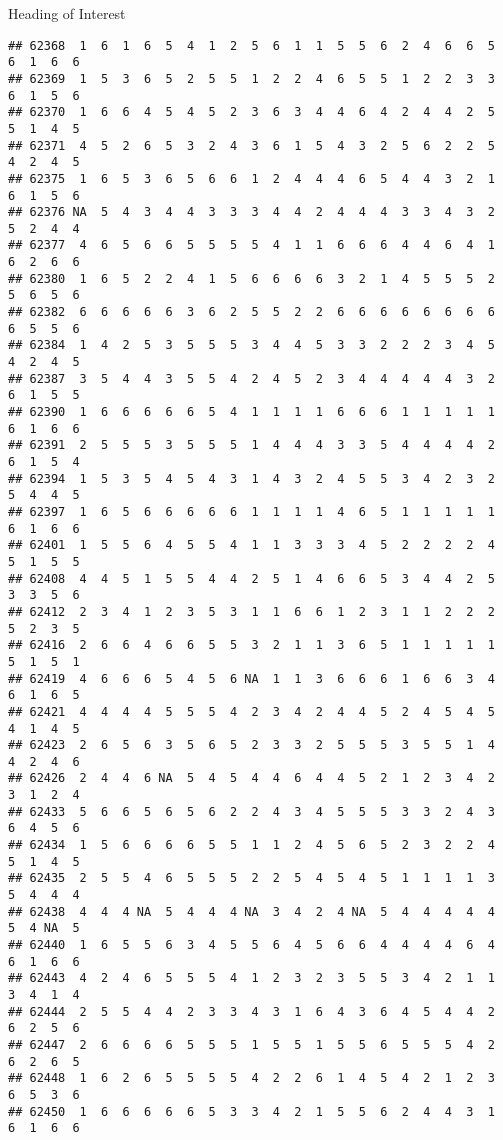 \documentclass[
  ignorenonframetext,
]{beamer}
\begin{document}
\begin{frame}[fragile]{Heading of Interest}
\begin{verbatim}
## 62368  1  6  1  6  5  4  1  2  5  6  1  1  5  5  6  2  4  6  6  5  6  1  6  6
## 62369  1  5  3  6  5  2  5  5  1  2  2  4  6  5  5  1  2  2  3  3  6  1  5  6
## 62370  1  6  6  4  5  4  5  2  3  6  3  4  4  6  4  2  4  4  2  5  5  1  4  5
## 62371  4  5  2  6  5  3  2  4  3  6  1  5  4  3  2  5  6  2  2  5  4  2  4  5
## 62375  1  6  5  3  6  5  6  6  1  2  4  4  4  6  5  4  4  3  2  1  6  1  5  6
## 62376 NA  5  4  3  4  4  3  3  3  4  4  2  4  4  4  3  3  4  3  2  5  2  4  4
## 62377  4  6  5  6  6  5  5  5  5  4  1  1  6  6  6  4  4  6  4  1  6  2  6  6
## 62380  1  6  5  2  2  4  1  5  6  6  6  6  3  2  1  4  5  5  5  2  5  6  5  6
## 62382  6  6  6  6  6  3  6  2  5  5  2  2  6  6  6  6  6  6  6  6  6  5  5  6
## 62384  1  4  2  5  3  5  5  5  3  4  4  5  3  3  2  2  2  3  4  5  4  2  4  5
## 62387  3  5  4  4  3  5  5  4  2  4  5  2  3  4  4  4  4  4  3  2  6  1  5  5
## 62390  1  6  6  6  6  6  5  4  1  1  1  1  6  6  6  1  1  1  1  1  6  1  6  6
## 62391  2  5  5  5  3  5  5  5  1  4  4  4  3  3  5  4  4  4  4  2  6  1  5  4
## 62394  1  5  3  5  4  5  4  3  1  4  3  2  4  5  5  3  4  2  3  2  5  4  4  5
## 62397  1  6  5  6  6  6  6  6  1  1  1  1  4  6  5  1  1  1  1  1  6  1  6  6
## 62401  1  5  5  6  4  5  5  4  1  1  3  3  3  4  5  2  2  2  2  4  5  1  5  5
## 62408  4  4  5  1  5  5  4  4  2  5  1  4  6  6  5  3  4  4  2  5  3  3  5  6
## 62412  2  3  4  1  2  3  5  3  1  1  6  6  1  2  3  1  1  2  2  2  5  2  3  5
## 62416  2  6  6  4  6  6  5  5  3  2  1  1  3  6  5  1  1  1  1  1  5  1  5  1
## 62419  4  6  6  6  5  4  5  6 NA  1  1  3  6  6  6  1  6  6  3  4  6  1  6  5
## 62421  4  4  4  4  5  5  5  4  2  3  4  2  4  4  5  2  4  5  4  5  4  1  4  5
## 62423  2  6  5  6  3  5  6  5  2  3  3  2  5  5  5  3  5  5  1  4  4  2  4  6
## 62426  2  4  4  6 NA  5  4  5  4  4  6  4  4  5  2  1  2  3  4  2  3  1  2  4
## 62433  5  6  6  5  6  5  6  2  2  4  3  4  5  5  5  3  3  2  4  3  6  4  5  6
## 62434  1  5  6  6  6  6  5  5  1  1  2  4  5  6  5  2  3  2  2  4  5  1  4  5
## 62435  2  5  5  4  6  5  5  5  2  2  5  4  5  4  5  1  1  1  1  3  5  4  4  4
## 62438  4  4  4 NA  5  4  4  4 NA  3  4  2  4 NA  5  4  4  4  4  4  5  4 NA  5
## 62440  1  6  5  5  6  3  4  5  5  6  4  5  6  6  4  4  4  4  6  4  6  1  6  6
## 62443  4  2  4  6  5  5  5  4  1  2  3  2  3  5  5  3  4  2  1  1  3  4  1  4
## 62444  2  5  5  4  4  2  3  3  4  3  1  6  4  3  6  4  5  4  4  2  6  2  5  6
## 62447  2  6  6  6  6  5  5  5  1  5  5  1  5  5  6  5  5  5  4  2  6  2  6  5
## 62448  1  6  2  6  5  5  5  5  4  2  2  6  1  4  5  4  2  1  2  3  6  5  3  6
## 62450  1  6  6  6  6  6  5  3  3  4  2  1  5  5  6  2  4  4  3  1  6  1  6  6

\end{verbatim}
\end{frame}
\end{document}
